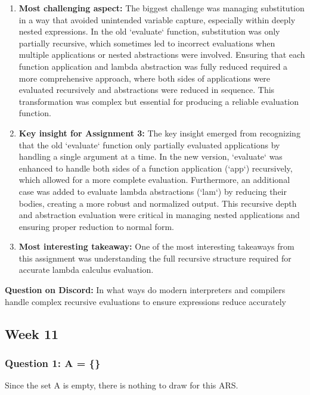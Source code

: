 \documentclass{article}
\theoremstyle{theorem}
\theoremstyle{definition}
\theoremstyle{remark}
\begin{document}
\begin{enumerate}
    \item \textbf{Most challenging aspect:} The biggest challenge was managing substitution in a way that avoided unintended variable capture, especially within deeply nested expressions. In the old `evaluate` function, substitution was only partially recursive, which sometimes led to incorrect evaluations when multiple applications or nested abstractions were involved. Ensuring that each function application and lambda abstraction was fully reduced required a more comprehensive approach, where both sides of applications were evaluated recursively and abstractions were reduced in sequence. This transformation was complex but essential for producing a reliable evaluation function.

    \item \textbf{Key insight for Assignment 3:} The key insight emerged from recognizing that the old `evaluate` function only partially evaluated applications by handling a single argument at a time. In the new version, `evaluate` was enhanced to handle both sides of a function application (`app`) recursively, which allowed for a more complete evaluation. Furthermore, an additional case was added to evaluate lambda abstractions (`lam`) by reducing their bodies, creating a more robust and normalized output. This recursive depth and abstraction evaluation were critical in managing nested applications and ensuring proper reduction to normal form.

    \item \textbf{Most interesting takeaway:} One of the most interesting takeaways from this assignment was understanding the full recursive structure required for accurate lambda calculus evaluation.
\end{enumerate}

\noindent \textbf{Question on Discord:} In what ways do modern interpreters and compilers handle complex recursive evaluations to ensure expressions reduce accurately


\subsection{Week 11}

\subsubsection*{Question 1: A = \{\}}

Since the set A is empty, there is nothing to draw for this ARS.
\end{document}
